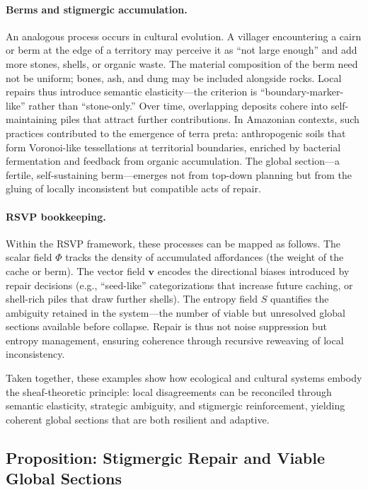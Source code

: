 \documentclass{article}
\begin{document}
\paragraph{Berms and stigmergic accumulation.}
An analogous process occurs in cultural evolution. A villager encountering a cairn or berm at the edge of a territory may perceive it as ``not large enough'' and add more stones, shells, or organic waste. The material composition of the berm need not be uniform; bones, ash, and dung may be included alongside rocks. Local repairs thus introduce semantic elasticity---the criterion is ``boundary-marker-like'' rather than ``stone-only.'' Over time, overlapping deposits cohere into self-maintaining piles that attract further contributions. In Amazonian contexts, such practices contributed to the emergence of terra preta: anthropogenic soils that form Voronoi-like tessellations at territorial boundaries, enriched by bacterial fermentation and feedback from organic accumulation. The global section---a fertile, self-sustaining berm---emerges not from top-down planning but from the gluing of locally inconsistent but compatible acts of repair.

\paragraph{RSVP bookkeeping.}
Within the RSVP framework, these processes can be mapped as follows. The scalar field $\Phi$ tracks the density of accumulated affordances (the weight of the cache or berm). The vector field $\mathbf{v}$ encodes the directional biases introduced by repair decisions (e.g., ``seed-like'' categorizations that increase future caching, or shell-rich piles that draw further shells). The entropy field $S$ quantifies the ambiguity retained in the system---the number of viable but unresolved global sections available before collapse. Repair is thus not noise suppression but entropy management, ensuring coherence through recursive reweaving of local inconsistency.

Taken together, these examples show how ecological and cultural systems embody the sheaf-theoretic principle: local disagreements can be reconciled through semantic elasticity, strategic ambiguity, and stigmergic reinforcement, yielding coherent global sections that are both resilient and adaptive.

\subsection{Proposition: Stigmergic Repair and Viable Global Sections}
\end{document}
